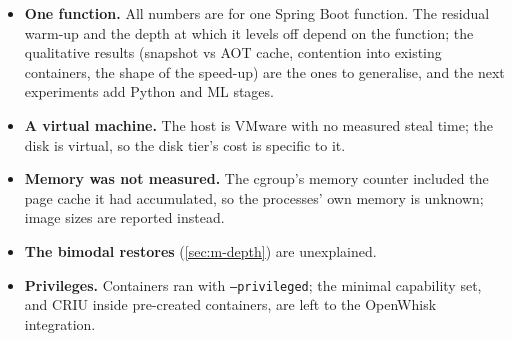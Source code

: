 \begin{itemize}
\item \textbf{One function.} All numbers are for one Spring Boot function. The residual warm-up and
      the depth at which it levels off depend on the function; the qualitative results
      (snapshot vs AOT cache, contention into existing containers, the shape of the speed-up)
      are the ones to generalise, and the next experiments add Python and ML stages.
\item \textbf{A virtual machine.} The host is VMware with no measured steal time; the disk is
      virtual, so the disk tier's cost is specific to it.
\item \textbf{Memory was not measured.} The cgroup's memory counter included the page cache it
      had accumulated, so the processes' own memory is unknown; image sizes are reported instead.
\item \textbf{The bimodal restores} (\cref{sec:m-depth}) are unexplained.
\item \textbf{Privileges.} Containers ran with \texttt{--privileged}; the minimal capability set,
      and CRIU inside pre-created containers, are left to the OpenWhisk integration.
\end{itemize}

